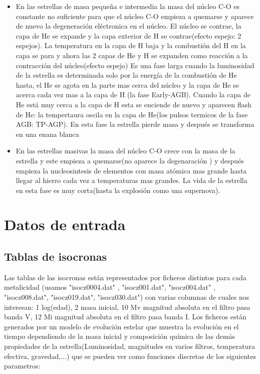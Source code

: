 \documentclass[10pt]{book}
\begin{document}
\begin{itemize}
\item En las estrellas de masa pequeña e intermedia la masa del núcleo C-O es constante no suficiente para que el núcleo C-O empieza a quemarse y aparece de nuevo la degeneración eléctronica en el núcleo. 
El núcleo se contrae, la capa de He se expande y la capa exterior de H se contrae(efecto espejo: 2 espejos). La temperatura en la capa de H baja y la combustión del H en la capa se para y ahora las 2 capas de He y H se expanden como reacción a la contracción del núcleo(efecto espejo)
Es una fase larga cuando la luminosidad de la estrella es determinada solo por la energía de la combustión de He hasta, el He se agota en la parte mas cerca del núcleo y la capa de He se acerca cada vez mas a la capa de H (la fase Early-AGB). 
Cuando la capa de He está muy cerca a la capa de H esta se enciende de nuevo y aparecen flash de He: la tempertaura oscila en la capa de He(los pulsos termicos de la fase AGB: TP-AGP). En esta fase la estrella pierde masa y después se transforma en una enana blanca
\item En las estrellas masivas la masa del núcleo C-O crece con la masa de la estrella y este empieza a quemarse(no aparece la degenaración ) y después empieza la nucleosintesis de elementos con masa atómica mas grande hasta llegar al hierro cada vez a temperaturas mas grandes. La vida de la estrella en esta fase es muy corta(hasta la explosión como una supernova).
\end{itemize}




\section*{Datos de entrada}
\subsection*{Tablas de isocronas}

Las tablas de las isocronas están representados por ficheros distintos para cada metalicidad (usamos "isocz0004.dat" , "isocz001.dat",  "isocz004.dat" , "isocz008.dat", "isocz019.dat", "isocz030.dat") con varias columnas de cuales nos interesan: 1 log(edad), 2 masa inicial, 10 Mv magnitud absoluta en el filtro pasa banda V, 12 Mi magnitud absoluta en el filtro pasa banda I.
Los ficheros están generados por un modelo de evolución estelar que muestra la evolución en el tiempo dependiendo de la masa inicial y composición química de las demás  propiedades de la estrella(Luminosidad, magnitudes en varios filtros, temperatura efectiva, gravedad,...) que se pueden ver como funciones discretas de los siguientes parametros:
\end{document}
